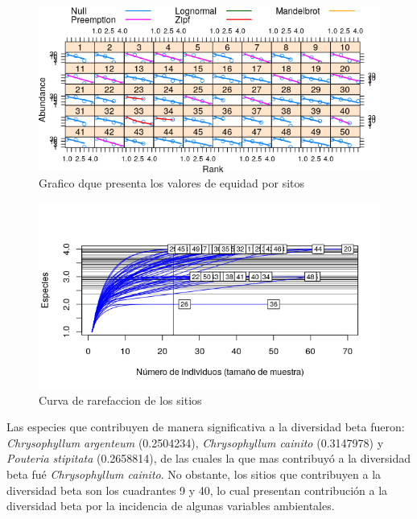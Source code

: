 \documentclass[11pt,]{article}
\begin{document}
\begin{figure}
\centering
\includegraphics{grafico_niveles_equidad.png}
\caption{Grafico dque presenta los valores de equidad por sitos
\label{fig:grafico_niveles_equidad}}
\end{figure}

\begin{figure}
\centering
\includegraphics{Curva_rarefaccion.png}
\caption{Curva de rarefaccion de los sitios
\label{fig:Curva_rarefaccion}}
\end{figure}

Las especies que contribuyen de manera significativa a la diversidad
beta fueron: \emph{Chrysophyllum argenteum} (0.2504234),
\emph{Chrysophyllum cainito} (0.3147978) y \emph{Pouteria stipitata}
(0.2658814), de las cuales la que mas contribuyó a la diversidad beta
fué \emph{Chrysophyllum cainito}. No obstante, los sitios que
contribuyen a la diversidad beta son los cuadrantes 9 y 40, lo cual
presentan contribución a la diversidad beta por la incidencia de algunas
variables ambientales.
\end{document}
